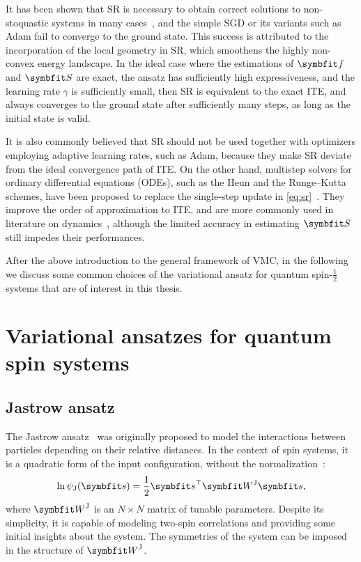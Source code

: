 It has been shown that SR is necessary to obtain correct solutions to non-stoquastic systems in many cases~\cite{carleo2017solving, choo2019two, bukov2021learning}, and the simple SGD or its variants such as Adam fail to converge to the ground state. This success is attributed to the incorporation of the local geometry in SR, which smoothens the highly non-convex energy landscape. In the ideal case where the estimations of $\vf$ and $\mS$ are exact, the ansatz has sufficiently high expressiveness, and the learning rate $\gamma$ is sufficiently small, then SR is equivalent to the exact ITE, and always converges to the ground state after sufficiently many steps, as long as the initial state is valid.

It is also commonly believed that SR should not be used together with optimizers employing adaptive learning rates, such as Adam, because they make SR deviate from the ideal convergence path of ITE. On the other hand, multistep solvers for ordinary differential equations (ODEs), such as the Heun and the Runge--Kutta schemes, have been proposed to replace the single-step update in \cref{eq:sr}~\cite{bukov2021learning}. They improve the order of approximation to ITE, and are more commonly used in literature on dynamics~\cite{schmitt2020quantum}, although the limited accuracy in estimating $\mS$ still impedes their performances.

After the above introduction to the general framework of VMC, in the following we discuss some common choices of the variational ansatz for quantum spin-$\frac{1}{2}$ systems that are of interest in this thesis.

\section{Variational ansatzes for quantum spin systems}

\subsection{Jastrow ansatz}
\label{sec:jastrow}

The Jastrow ansatz~\cite{jastrow1955many} was originally proposed to model the interactions between particles depending on their relative distances. In the context of spin systems, it is a quadratic form of the input configuration, without the normalization~\cite{huse1988simple}:
\begin{equation}
\ln \psi_\text{J}(\vs) = \frac{1}{2} \vs^\transpose \mW^\text{J} \vs,
\end{equation}
where $\mW^\text{J}$ is an $N \times N$ matrix of tunable parameters. Despite its simplicity, it is capable of modeling two-spin correlations and providing some initial insights about the system. The symmetries of the system can be imposed in the structure of $\mW^\text{J}$.

